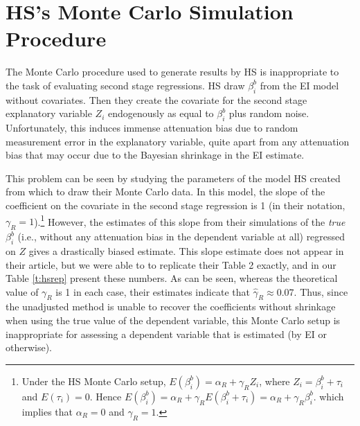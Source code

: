 \documentclass[11pt,titlepage]{article}
\begin{document}
\section{HS's Monte Carlo Simulation Procedure}

The Monte Carlo procedure used to generate results by HS is
inappropriate to the task of evaluating second stage regressions.  HS
draw $\beta_i^b$ from the EI model without covariates.  Then they
create the covariate for the second stage explanatory variable $Z_i$
endogenously as equal to $\beta_i^b$ plus random noise.
Unfortunately, this induces immense attenuation bias due to random
measurement error in the explanatory variable, quite apart from any
attenuation bias that may occur due to the Bayesian shrinkage in the
EI estimate.

This problem can be seen by studying the parameters of the model HS
created from which to draw their Monte Carlo data.  In this model, the
slope of the coefficient on the covariate in the second stage
regression is 1 (in their notation, $\gamma_R=1$).\footnote{Under the
  HS Monte Carlo setup, $E(\beta_i^b)=\alpha_R+\gamma_R Z_i$, where
  $Z_i=\beta_i^b+\tau_i$ and $E(\tau_i)=0$.  Hence
  $E(\beta_i^b)=\alpha_R+\gamma_RE(\beta_i^b+\tau_i)=\alpha_R+\gamma_R\beta_i^b$.
  which implies that $\alpha_R=0$ and $\gamma_R=1$.}  However, the
estimates of this slope from their simulations of the \emph{true}
$\beta_i^b$ (i.e., without any attenuation bias in the dependent
variable at all) regressed on $Z$ gives a drastically biased estimate.
This slope estimate does not appear in their article, but we were able
to to replicate their Table 2 exactly, and in our Table \ref{t:hsrep}
present these numbers.  As can be seen, whereas the theoretical value
of $\gamma_R$ is 1 in each case, their estimates indicate that
$\hat\gamma_R\approx 0.07$.  Thus, since the unadjusted method is
unable to recover the coefficients without shrinkage when using the
true value of the dependent variable, this Monte Carlo setup is
inappropriate for assessing a dependent variable that is estimated (by
EI or otherwise).
\end{document}
